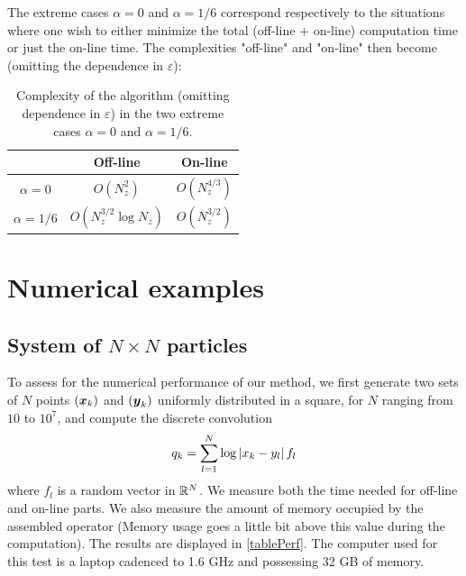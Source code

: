 \documentclass[smallextended]{svjour3}
\begin{document}
\begin{remark}
	The extreme cases $\alpha= 0$ and $\alpha = 1/6$ correspond respectively to the situations where one wish to either minimize the total (off-line $+$ on-line) computation time or just the on-line time. The complexities "off-line" and "on-line" then become (omitting the dependence in $\varepsilon$):	
	\begin{table}[H]
		\centering
		\begin{tabular}{ |c|c|c| } 
			\hline
			               & Off-line                          & On-line        \\ 
			\hline
			$\alpha = 0$   & $O(N_z^2)$                        & $O(N_z^{4/3})$ \\ 
			$\alpha = 1/6$ & $O\left(N_z^{3/2}\log N_z\right)$ & $O(N_z^{3/2})$ \\ 
			\hline
		\end{tabular}
		\caption{Complexity of the algorithm (omitting dependence in $\varepsilon$) in the two extreme cases $\alpha=0$ and $\alpha = 1/6$.}
	\end{table}									
\end{remark}
																																																		
\section{Numerical examples}
																																																		
\subsection{System of $N\times N$ particles}
																												
To assess for the numerical performance of our method, we first generate two sets of $N$ points $(\boldsymbol{x}_k)$ and $(\boldsymbol{y}_k)$ uniformly distributed in a square, for $N$ ranging from $10$ to $10^7$, and compute the discrete convolution  
\[ q_k = \sum_{l=1}^N \log\left\lvert x_k - y_l \right\rvert f_l\]
where $f_l$ is a random vector in $\mathbb{R}^{N}$.
We measure both the time needed for off-line and on-line parts. We also measure the amount of memory occupied by the assembled operator (Memory usage goes a little bit above this value during the computation). The results are displayed in \autoref{tablePerf}. The computer used for this test is a laptop cadenced to 1.6 GHz and possessing 32 GB of memory. 
																																																		
\end{document}
